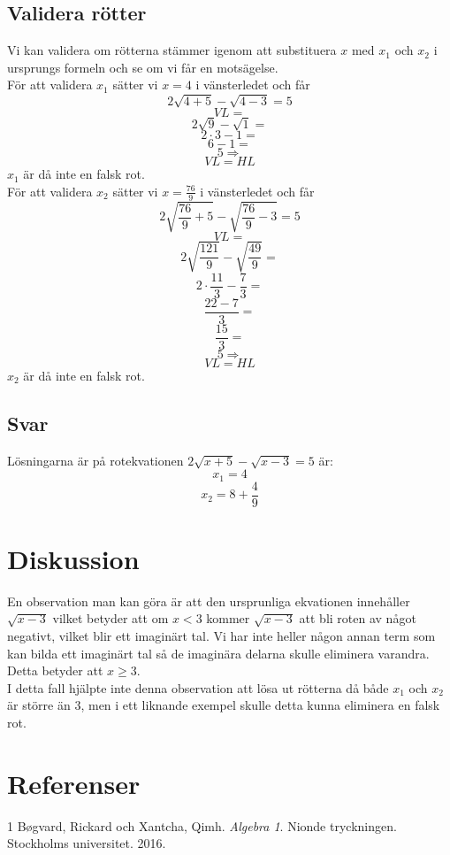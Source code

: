 \documentclass[11pt]{article}
\begin{document}
\subsection{Validera rötter}
  Vi kan validera om rötterna stämmer igenom att substituera $x$ med $x_1$ och $x_2$ i ursprungs formeln och se om vi får en motsägelse.\\
För att validera $x_1$ sätter vi $x=4$ i vänsterledet och får
  $$2\sqrt{4+5}-\sqrt{4-3} = 5$$
  $$VL =$$
  $$2\sqrt{9}-\sqrt{1} =$$
  $$2 \cdot 3-1 =$$
  $$6 - 1 =$$
  $$5 \Rightarrow$$
  $$VL = HL$$
  $x_1$ är då inte en falsk rot.\\
  För att validera $x_2$ sätter vi $x=\frac{76}{9}$ i vänsterledet och får  
  $$2\sqrt{\frac{76}{9}+5}-\sqrt{\frac{76}{9}-3} = 5$$
  $$VL =$$
  $$2\sqrt{\frac{121}{9}}-\sqrt{\frac{49}{9}} =$$
  $$2 \cdot \frac{11}{3} - \frac{7}{3} =$$
  $$\frac{22 - 7}{3} = $$
  $$\frac{15}{3} =$$
  $$5 \Rightarrow$$
  $$VL = HL$$
  $x_2$ är då inte en falsk rot.\\
  
\subsection{Svar}
Lösningarna är på rotekvationen $2\sqrt{x+5}-\sqrt{x-3} = 5$ är:
$$x_1 = 4$$
$$x_2 = 8 + \frac{4}{9}$$
\section{Diskussion}

En observation man kan göra är att den ursprunliga ekvationen innehåller $\sqrt{x-3}$ vilket betyder att om $x < 3 $ kommer $\sqrt{x-3}$ att bli roten av något negativt, vilket blir ett imaginärt tal. Vi har inte heller någon annan term som kan bilda ett imaginärt tal så de imaginära delarna skulle eliminera varandra. Detta betyder att $x \geq 3 $.\\
I detta fall hjälpte inte denna observation att lösa ut rötterna då både $x_1$ och $x_2$ är större än 3, men i ett liknande exempel skulle detta kunna eliminera en falsk rot.
\section{Referenser}
1 Bøgvard, Rickard och Xantcha, Qimh. \textit{Algebra 1}. Nionde tryckningen. Stockholms universitet. 2016.
\end{document}
